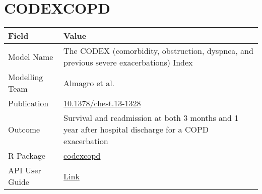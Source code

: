 \documentclass[
]{book}
\begin{document}
\hypertarget{codexcopd}{%
\chapter{CODEXCOPD}\label{codexcopd}}

\begin{longtable}[]{@{}ll@{}}
\toprule
\begin{minipage}[b]{0.45\columnwidth}\raggedright
Field\strut
\end{minipage} & \begin{minipage}[b]{0.49\columnwidth}\raggedright
Value\strut
\end{minipage}\tabularnewline
\midrule
\endhead
\begin{minipage}[t]{0.45\columnwidth}\raggedright
Model Name\strut
\end{minipage} & \begin{minipage}[t]{0.49\columnwidth}\raggedright
The CODEX (comorbidity, obstruction, dyspnea, and previous severe exacerbations) Index\strut
\end{minipage}\tabularnewline
\begin{minipage}[t]{0.45\columnwidth}\raggedright
Modelling Team\strut
\end{minipage} & \begin{minipage}[t]{0.49\columnwidth}\raggedright
Almagro et al.\strut
\end{minipage}\tabularnewline
\begin{minipage}[t]{0.45\columnwidth}\raggedright
Publication\strut
\end{minipage} & \begin{minipage}[t]{0.49\columnwidth}\raggedright
\href{https://doi.org/10.1378/chest.13-1328}{10.1378/chest.13-1328}\strut
\end{minipage}\tabularnewline
\begin{minipage}[t]{0.45\columnwidth}\raggedright
Outcome\strut
\end{minipage} & \begin{minipage}[t]{0.49\columnwidth}\raggedright
Survival and readmission at both 3 months and 1 year after hospital discharge for a COPD exacerbation\strut
\end{minipage}\tabularnewline
\begin{minipage}[t]{0.45\columnwidth}\raggedright
R Package\strut
\end{minipage} & \begin{minipage}[t]{0.49\columnwidth}\raggedright
\href{https://github.com/resplab/codexcopd}{codexcopd}\strut
\end{minipage}\tabularnewline
\begin{minipage}[t]{0.45\columnwidth}\raggedright
API User Guide\strut
\end{minipage} & \begin{minipage}[t]{0.49\columnwidth}\raggedright
\href{https://resplab.github.io/prismguide/api-users-guide.html\#codexcopd-1}{Link}\strut
\end{minipage}\tabularnewline
\bottomrule
\end{longtable}
\end{document}
